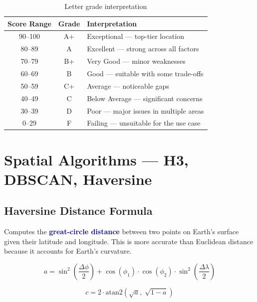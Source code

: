 \documentclass[12pt, a4paper]{article}
\newcommand{\concept}[1]{\textbf{\textcolor{darkblue}{#1}}}
\begin{document}
\begin{table}[H]
\centering
\begin{tabular}{c c l}
    \toprule
    \textbf{Score Range} & \textbf{Grade} & \textbf{Interpretation} \\
    \midrule
    90--100 & A+ & Exceptional — top-tier location \\
    80--89  & A  & Excellent — strong across all factors \\
    70--79  & B+ & Very Good — minor weaknesses \\
    60--69  & B  & Good — suitable with some trade-offs \\
    50--59  & C+ & Average — noticeable gaps \\
    40--49  & C  & Below Average — significant concerns \\
    30--39  & D  & Poor — major issues in multiple areas \\
    0--29   & F  & Failing — unsuitable for the use case \\
    \bottomrule
\end{tabular}
\caption{Letter grade interpretation}
\end{table}

\newpage

\section{Spatial Algorithms — H3, DBSCAN, Haversine}

\subsection{Haversine Distance Formula}

Computes the \concept{great-circle distance} between two points on Earth's surface
given their latitude and longitude. This is more accurate than Euclidean distance
because it accounts for Earth's curvature.

\begin{equation}
    a = \sin^2\!\left(\frac{\Delta\phi}{2}\right) + \cos(\phi_1) \cdot \cos(\phi_2) \cdot \sin^2\!\left(\frac{\Delta\lambda}{2}\right)
\end{equation}

\begin{equation}
    c = 2 \cdot \text{atan2}\!\left(\sqrt{a},\; \sqrt{1-a}\right)
\end{equation}
\end{document}
